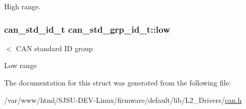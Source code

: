 High range. 

\subsubsection[{\texorpdfstring{low}{low}}]{\setlength{\rightskip}{0pt plus 5cm}can\+\_\+std\+\_\+id\+\_\+t can\+\_\+std\+\_\+grp\+\_\+id\+\_\+t\+::low}\hypertarget{structcan__std__grp__id__t_aeb91d861e04959be79446296e0dcfecf}{}\label{structcan__std__grp__id__t_aeb91d861e04959be79446296e0dcfecf}


$<$ C\+AN standard ID group 

Low range 

The documentation for this struct was generated from the following file\+:\begin{DoxyCompactItemize}
\item 
/var/www/html/\+S\+J\+S\+U-\/\+D\+E\+V-\/\+Linux/firmware/default/lib/\+L2\+\_\+\+Drivers/\hyperlink{can_8h}{can.\+h}\end{DoxyCompactItemize}
